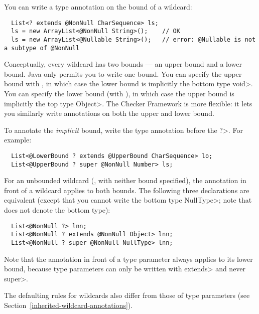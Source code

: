 You can write a type annotation on the bound of a wildcard:

\begin{Verbatim}
  List<? extends @NonNull CharSequence> ls;
  ls = new ArrayList<@NonNull String>();    // OK
  ls = new ArrayList<@Nullable String>();   // error: @Nullable is not a subtype of @NonNull
\end{Verbatim}

Conceptually, every wildcard has two bounds --- an upper bound and a lower
bound.  Java only permits you to write one bound.
You can specify the upper bound with , in which
case the lower bound is implicitly the bottom type \<void>.
You can specify the lower bound (with ), in
which case the upper bound is implicitly the top type \<Object>.
The Checker Framework is more flexible:  it lets you similarly write
annotations on both the upper and lower bound.

To annotate the \emph{implicit} bound, write the type annotation
before the \<?>.  For example:

\begin{Verbatim}
  List<@LowerBound ? extends @UpperBound CharSequence> lo;
  List<@UpperBound ? super @NonNull Number> ls;
\end{Verbatim}

For an unbounded wildcard (, with neither
bound specified), the annotation in front of a wildcard applies
to both bounds.  The following three declarations are equivalent (except
that you cannot write the bottom type \<NullType>; note that
 does not denote the bottom type):

\begin{Verbatim}
  List<@NonNull ?> lnn;
  List<@NonNull ? extends @NonNull Object> lnn;
  List<@NonNull ? super @NonNull NullType> lnn;
\end{Verbatim}

\noindent
Note that the annotation in front of a type parameter always applies to its
lower bound, because type parameters can only be written with \<extends>
and never \<super>.



The defaulting rules for
wildcards also differ from those of type parameters (see
Section~\ref{inherited-wildcard-annotations}).


